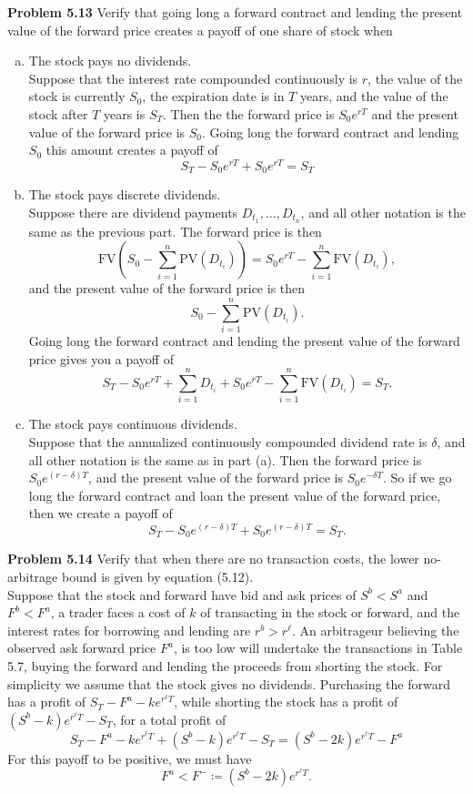 \documentclass[12pt]{article}
\newcommand{\problem}[1]{\bigskip \noindent \textbf{Problem #1}}
\newcommand{\PV}{\text{PV}}
\newcommand{\FV}{\text{FV}}
\theoremstyle{plain}
\begin{document}
\problem{5.13} Verify that going long a forward contract and lending the present value of the forward price creates a payoff of one share of stock when
\begin{enumerate}[(a)]
\item The stock pays no dividends.\\

Suppose that the interest rate compounded continuously is $r$, the value of the stock is currently $S_0$, the expiration date is in $T$ years, and the value of the stock after $T$ years is $S_T$. Then the the forward price is $S_0 e^{rT}$ and the present value of the forward price is $S_0$. Going long the forward contract and lending $S_0$ this amount creates a payoff of
\[
S_T - S_0e^{rT} + S_0e^{rT} = S_T
\]

\item The stock pays discrete dividends.\\

Suppose there are dividend payments $D_{t_1},\ldots,D_{t_n}$, and all other notation is the same as the previous part. The forward price is then
\[
\FV\left(S_0 - \sum_{i=1}^n \PV\left(D_{t_i}\right)\right) = S_0e^{rT} - \sum_{i=1}^n \FV\left( D_{t_i}\right),
\]
and the present value of the forward price is then
\[
S_0 - \sum_{i=1}^n \PV\left(D_{t_i}\right).
\]
Going long the forward contract and lending the present value of the forward price gives you a payoff of
\[
S_T - S_0e^{rT} + \sum_{i=1}^n D_{t_i} + S_0e^{rT} - \sum_{i=1}^n \FV\left( D_{t_i} \right) = S_T.
\]

\item The stock pays continuous dividends.\\

Suppose that the annualized continuously compounded dividend rate is $\delta$, and all other notation is the same as in part (a). Then the forward price is $S_0e^{(r - \delta)T}$, and the present value of the forward price is $S_0e^{-\delta T}$. So if we go long the forward contract and loan the present value of the forward price, then we create a payoff of
\[
S_T - S_0e^{(r - \delta)T} + S_0e^{(r - \delta)T} = S_T.
\]
\end{enumerate}

\problem{5.14} Verify that when there are no transaction costs, the lower no-arbitrage bound is given by equation (5.12).\\

Suppose that the stock and forward have bid and ask prices of $S^b < S^a$ and $F^b < F^a$, a trader faces a cost of $k$ of transacting in the stock or forward, and the interest rates for borrowing and lending are $r^b > r^{\ell}$. An arbitrageur believing the observed ask forward price $F^a$, is too low will undertake the transactions in Table 5.7, buying the forward and lending the proceeds from shorting the stock. For simplicity we assume that the stock gives no dividends. Purchasing the forward has a profit of $S_T - F^a - ke^{r^{\ell}T}$, while shorting the stock has a profit of $(S^b-k)e^{r^{\ell}T}- S_T$, for a total profit of
\[
S_T - F^a - ke^{r^{\ell}T} + (S^b - k)e^{r^{\ell}T} - S_T = (S^b - 2k)e^{r^{\ell}T} - F^a
\]
For this payoff to be positive, we must have
\[
F^a < F^- \coloneqq (S^b - 2k)e^{r^{\ell}T}.
\]
\end{document}
